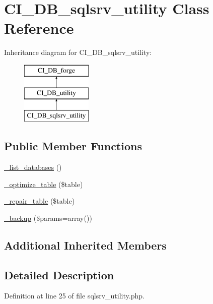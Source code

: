 \hypertarget{class_c_i___d_b__sqlsrv__utility}{\section{C\-I\-\_\-\-D\-B\-\_\-sqlsrv\-\_\-utility Class Reference}
\label{class_c_i___d_b__sqlsrv__utility}
}
Inheritance diagram for C\-I\-\_\-\-D\-B\-\_\-sqlsrv\-\_\-utility\-:\begin{figure}[H]
\begin{center}
\leavevmode
\includegraphics[height=3.000000cm]{class_c_i___d_b__sqlsrv__utility}
\end{center}
\end{figure}
\subsection*{Public Member Functions}
\begin{DoxyCompactItemize}
\item 
\hyperlink{class_c_i___d_b__sqlsrv__utility_aa047e69a7e732ca7280270f87f82bb3a}{\-\_\-list\-\_\-databases} ()
\item 
\hyperlink{class_c_i___d_b__sqlsrv__utility_a4856292816fbbc8e9d927f565766727b}{\-\_\-optimize\-\_\-table} (\$table)
\item 
\hyperlink{class_c_i___d_b__sqlsrv__utility_a7f40d4a3d78917e455e315cf708842ef}{\-\_\-repair\-\_\-table} (\$table)
\item 
\hyperlink{class_c_i___d_b__sqlsrv__utility_a30f3053d2c82e7562349924363507afa}{\-\_\-backup} (\$params=array())
\end{DoxyCompactItemize}
\subsection*{Additional Inherited Members}


\subsection{Detailed Description}


Definition at line 25 of file sqlsrv\-\_\-utility.\-php.



